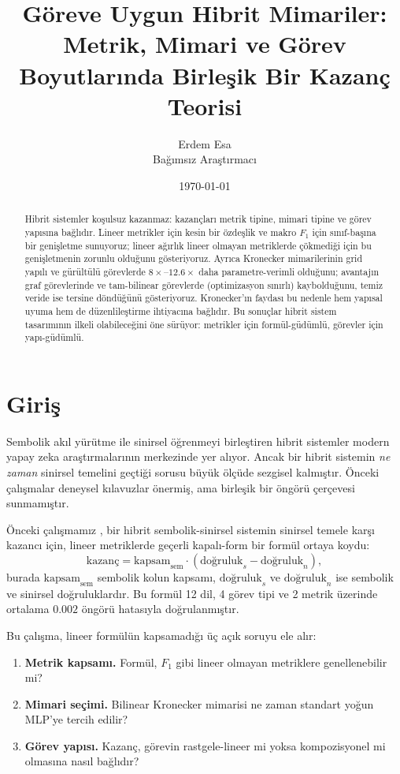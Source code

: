 \documentclass[11pt,a4paper]{article}
\title{Göreve Uygun Hibrit Mimariler:\\
Metrik, Mimari ve Görev Boyutlarında Birleşik Bir Kazanç Teorisi}
\author{Erdem Esa\\ \small Bağımsız Araştırmacı}
\date{\today}
\begin{document}
\maketitle

\begin{abstract}
Hibrit sistemler koşulsuz kazanmaz: kazançları metrik tipine, mimari
tipine ve görev yapısına bağlıdır. Lineer metrikler için kesin bir
özdeşlik ve makro $F_1$ için sınıf-başına bir genişletme sunuyoruz;
lineer ağırlık lineer olmayan metriklerde çökmediği için bu genişletmenin
zorunlu olduğunu gösteriyoruz. Ayrıca Kronecker mimarilerinin
grid yapılı ve gürültülü görevlerde $8\times$--$12.6\times$ daha
parametre-verimli olduğunu; avantajın graf görevlerinde ve tam-bilinear
görevlerde (optimizasyon sınırlı) kaybolduğunu, temiz veride ise tersine
döndüğünü gösteriyoruz. Kronecker'ın faydası bu nedenle hem yapısal
uyuma hem de düzenlileştirme ihtiyacına bağlıdır. Bu
sonuçlar hibrit sistem tasarımının ilkeli olabileceğini öne sürüyor:
metrikler için formül-güdümlü, görevler için yapı-güdümlü.
\end{abstract}


\section{Giriş}
\label{sec:intro}

Sembolik akıl yürütme ile sinirsel öğrenmeyi birleştiren hibrit
sistemler modern yapay zeka araştırmalarının merkezinde yer alıyor.
Ancak bir hibrit sistemin \emph{ne zaman} sinirsel temelini geçtiği
sorusu büyük ölçüde sezgisel kalmıştır. Önceki çalışmalar deneysel
kılavuzlar önermiş, ama birleşik bir öngörü çerçevesi sunmamıştır.

Önceki çalışmamız \cite{esa2026preprint1}, bir hibrit sembolik-sinirsel
sistemin sinirsel temele karşı kazancı için, lineer metriklerde geçerli
kapalı-form bir formül ortaya koydu:
\begin{equation}
\text{kazanç} = \text{kapsam}_{\text{sem}} \cdot
(\text{doğruluk}_s - \text{doğruluk}_n),
\label{eq:linear}
\end{equation}
burada $\text{kapsam}_{\text{sem}}$ sembolik kolun kapsamı,
$\text{doğruluk}_s$ ve $\text{doğruluk}_n$ ise sembolik ve sinirsel
doğruluklardır. Bu formül 12 dil, 4 görev tipi ve 2 metrik üzerinde
ortalama $0.002$ öngörü hatasıyla doğrulanmıştır.

Bu çalışma, lineer formülün kapsamadığı üç açık soruyu ele alır:

\begin{enumerate}
\item \textbf{Metrik kapsamı.} Formül, $F_1$ gibi lineer olmayan
metriklere genellenebilir mi?
\item \textbf{Mimari seçimi.} Bilinear Kronecker mimarisi ne zaman
standart yoğun MLP'ye tercih edilir?
\item \textbf{Görev yapısı.} Kazanç, görevin rastgele-lineer mi yoksa
kompozisyonel mi olmasına nasıl bağlıdır?
\end{enumerate}
\end{document}
